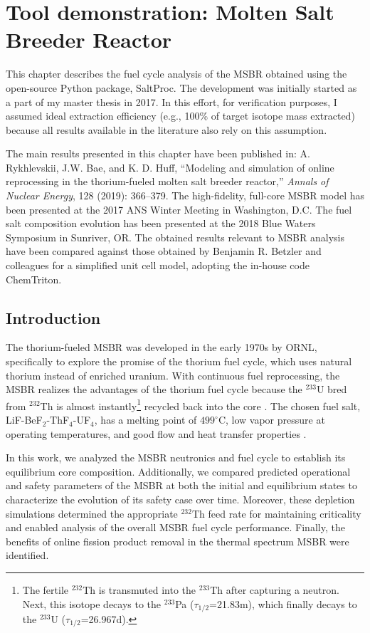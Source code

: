 \chapter{Tool demonstration: Molten Salt Breeder Reactor}

This chapter describes the fuel cycle analysis of the \gls{MSBR} obtained 
using the open-source Python package, SaltProc. The development was initially 
started as a part of my master thesis \cite{rykhlevskii_advanced_2018} in 
2017.  In this effort, for verification purposes, I assumed ideal extraction 
efficiency (e.g., 100\% of target isotope mass extracted) because all results 
available in the literature also rely on this assumption.

The main results presented in this chapter have been published in: A. 
Rykhlevskii, J.W. Bae, and K. D. Huff, ``Modeling and simulation of online 
reprocessing in the thorium-fueled molten salt breeder reactor,'' 
\textit{Annals of Nuclear Energy}, 128 (2019): 366--379. The high-fidelity, 
full-core \gls{MSBR} model has been presented at the 2017 \gls{ANS} Winter 
Meeting in Washington, D.C. The fuel salt composition evolution has been 
presented at the 2018 Blue Waters Symposium in Sunriver, OR. The obtained 
results relevant to \gls{MSBR} analysis have been compared against those 
obtained by Benjamin R. Betzler and colleagues for a simplified unit cell 
model, adopting the in-house code ChemTriton. 


\section{Introduction}
The thorium-fueled \gls{MSBR} was developed in the early 1970s by \gls{ORNL},  
specifically to explore the promise of the thorium fuel cycle, which uses 
natural thorium instead of enriched uranium. With continuous fuel 
reprocessing, the \gls{MSBR} realizes the advantages of the thorium fuel cycle 
because the $^{233}$U bred from $^{232}$Th is almost instantly\footnote{\space 
The fertile $^{232}$Th is transmuted into the $^{233}$Th after capturing a 
neutron. Next, this isotope decays to the $^{233}$Pa ($\tau_{1/2}$=21.83m), 
which finally decays to the $^{233}$U ($\tau_{1/2}$=26.967d).} recycled back 
into the core  \cite{betzler_modeling_2016}. The chosen fuel salt, 
LiF-BeF$_2$-ThF$_4$-UF$_4$, has a melting point of $499^\circ$C, low vapor 
pressure at operating temperatures, and good flow and heat transfer properties 
\cite{robertson_conceptual_1971}. 

In this work, we analyzed the \gls{MSBR} neutronics and fuel cycle to  
establish its equilibrium core composition. Additionally, we compared  
predicted operational and safety parameters of the \gls{MSBR} at both the  
initial and equilibrium states to characterize the evolution of its safety 
case over time. Moreover, these depletion simulations determined the  
appropriate $^{232}$Th feed rate for maintaining criticality and enabled 
analysis of the overall \gls{MSBR} fuel cycle performance. Finally, the 
benefits of online fission product removal in the thermal spectrum \gls{MSBR} 
were identified.



